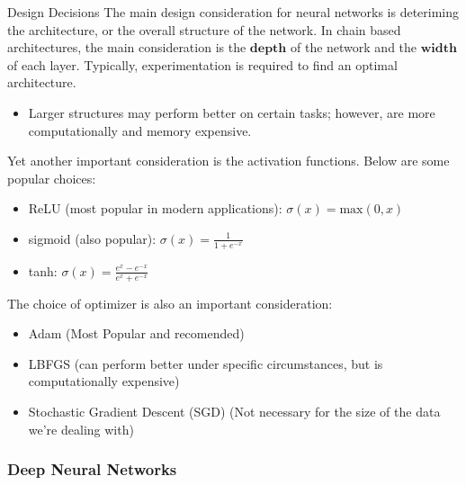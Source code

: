 \documentclass{beamer}
\begin{document}
\begin{frame}[plain]{Design Decisions}
    \small{The main design consideration for neural networks is deteriming the architecture, or the overall structure of the network. In chain based architectures, the main consideration
    is the $\textbf{depth}$ of the network and the $\textbf{width}$ of each layer. Typically, experimentation is required to find an optimal architecture.}
    \begin{itemize}
        \item Larger structures may perform better on certain tasks; however, are more computationally and memory expensive. 
    \end{itemize}
    \small{Yet another important consideration is the activation functions. Below are some popular choices:}
    \begin{itemize}
        \item ReLU (most popular in modern applications): $\sigma(x) = \text{max}(0, x)$
        \item sigmoid (also popular): $\sigma(x) = \frac{1}{1 + e^{-x}}$
        \item tanh: $\sigma(x) = \frac{e^{x} - e^{-x}}{e^{x} + e^{-x}}$
    \end{itemize}
    The choice of optimizer is also an important consideration:
    \begin{itemize}
        \item Adam (Most Popular and recomended)
        \item LBFGS (can perform better under specific circumstances, but is computationally expensive)
        \item Stochastic Gradient Descent (SGD) (Not necessary for the size of the data we're dealing with)
    \end{itemize}


\end{frame}
\subsubsection{Deep Neural Networks}
\end{document}
